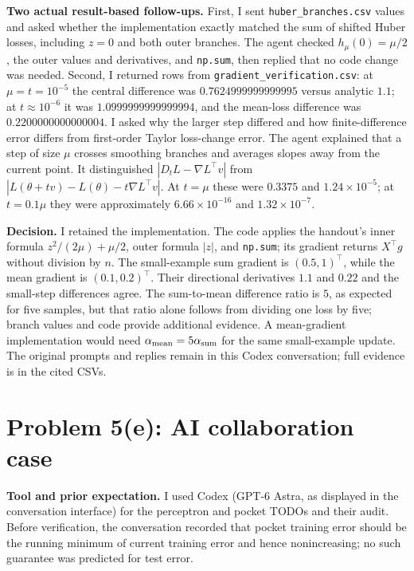 \documentclass[11pt,a4paper]{article}
\begin{document}
\noindent\textbf{Two actual result-based follow-ups.} First, I sent \texttt{huber\_branches.csv} values and asked whether the implementation exactly matched the sum of shifted Huber losses, including $z=0$ and both outer branches. The agent checked $h_\mu(0)=\mu/2$, the outer values and derivatives, and \texttt{np.sum}, then replied that no code change was needed. Second, I returned rows from \texttt{gradient\_verification.csv}: at $\mu=t=10^{-5}$ the central difference was $0.7624999999999995$ versus analytic $1.1$; at $t\approx10^{-6}$ it was $1.0999999999999994$, and the mean-loss difference was $0.2200000000000004$. I asked why the larger step differed and how finite-difference error differs from first-order Taylor loss-change error. The agent explained that a step of size $\mu$ crosses smoothing branches and averages slopes away from the current point. It distinguished $|D_tL-\nabla L^\top v|$ from $|L(\theta+tv)-L(\theta)-t\nabla L^\top v|$. At $t=\mu$ these were $0.3375$ and $1.24\times10^{-5}$; at $t=0.1\mu$ they were approximately $6.66\times10^{-16}$ and $1.32\times10^{-7}$.

\noindent\textbf{Decision.} I retained the implementation. The code applies the handout's inner formula $z^2/(2\mu)+\mu/2$, outer formula $|z|$, and \texttt{np.sum}; its gradient returns $X^\top g$ without division by $n$. The small-example sum gradient is $(0.5,1)^\top$, while the mean gradient is $(0.1,0.2)^\top$. Their directional derivatives $1.1$ and $0.22$ and the small-step differences agree. The sum-to-mean difference ratio is $5$, as expected for five samples, but that ratio alone follows from dividing one loss by five; branch values and code provide additional evidence. A mean-gradient implementation would need $\alpha_{\rm mean}=5\alpha_{\rm sum}$ for the same small-example update. The original prompts and replies remain in this Codex conversation; full evidence is in the cited CSVs.

\clearpage
\section*{Problem 5(e): AI collaboration case}
\noindent\textbf{Tool and prior expectation.} I used Codex (GPT-6 Astra, as displayed in the conversation interface) for the perceptron and pocket TODOs and their audit. Before verification, the conversation recorded that pocket training error should be the running minimum of current training error and hence nonincreasing; no such guarantee was predicted for test error.
\end{document}
